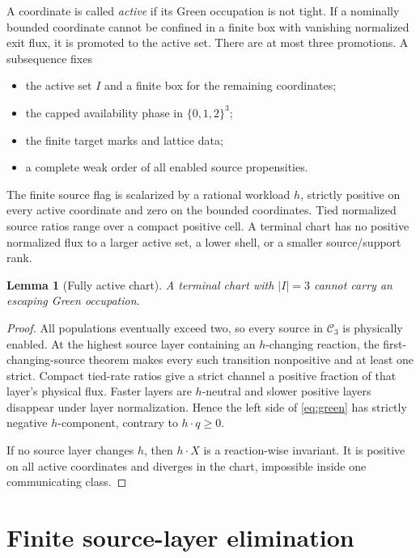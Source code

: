 \documentclass[11pt]{article}
\newtheorem{lemma}[theorem]{Lemma}
\theoremstyle{definition}\newtheorem{definition}[theorem]{Definition}
\theoremstyle{remark}\newtheorem{remark}[theorem]{Remark}
\begin{document}
A coordinate is called \emph{active} if its Green occupation is not tight.  If a nominally bounded coordinate cannot be confined in a finite box with vanishing normalized exit flux, it is promoted to the active set.  There are at most three promotions.  A subsequence fixes
\begin{itemize}
\item the active set $I$ and a finite box for the remaining coordinates;
\item the capped availability phase in $\{0,1,2\}^3$;
\item the finite target marks and lattice data;
\item a complete weak order of all enabled source propensities.
\end{itemize}
The finite source flag is scalarized by a rational workload $h$, strictly positive on every active coordinate and zero on the bounded coordinates.  Tied normalized source ratios range over a compact positive cell.  A terminal chart has no positive normalized flux to a larger active set, a lower shell, or a smaller source/support rank.

\begin{lemma}[Fully active chart]\label{lem:interior}
A terminal chart with $|I|=3$ cannot carry an escaping Green occupation.
\end{lemma}

\begin{proof}
All populations eventually exceed two, so every source in $\mathcal C_3$ is physically enabled.  At the highest source layer containing an $h$-changing reaction, the first-changing-source theorem makes every such transition nonpositive and at least one strict.  Compact tied-rate ratios give a strict channel a positive fraction of that layer's physical flux.  Faster layers are $h$-neutral and slower positive layers disappear under layer normalization.  Hence the left side of \eqref{eq:green} has strictly negative $h$-component, contrary to $h\cdot q\ge0$.

If no source layer changes $h$, then $h\cdot X$ is a reaction-wise invariant.  It is positive on all active coordinates and diverges in the chart, impossible inside one communicating class.
\end{proof}

\section{Finite source-layer elimination}
\end{document}
